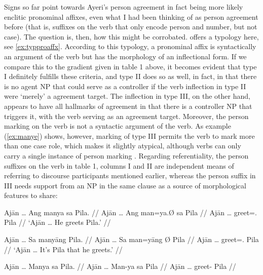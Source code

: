 Signs so far point towards Ayeri's person agreement in fact being more likely
enclitic pronominal affixes, even what I had been thinking of as person
agreement before (that is, suffixes on the verb that only encode person and
number, but not case). The question is, then, how this might be corrobated.
\citeauthor{corbett2006} offers a typology here, see \autoref{ex:typproaffx}.
According to this typology, a pronominal affix is syntactically an argument of
the verb but has the morphology of an inflectional form. If we compare this to
the gradient given in table 1 above, it becomes evident that type I definitely
fulfills these criteria, and type II does so as well, in fact, in that there is
no agent NP that could serve as a controller if the verb inflection in type II
were `merely' a agreement target. The inflection in type III, on the other
hand, appears to have all hallmarks of agreement in that there is a controller
NP that triggers it, with the verb serving as an agreement target. Moreover,
the person marking on the verb is not a syntactic argument of the verb. As
example (\ref{ex:manye}) shows, however, marking of type III permits the verb
to mark more than one case role, which makes it slightly atypical, although
verbs can only carry a single instance of person marking
\citep[103]{corbett2006}. Regarding referentiality, the person suffixes on the
verb in table 1, columns I and II are independent means of referring to
discourse participants mentioned earlier, whereas the person suffix in III
needs support from an NP in the same clause as a source of morphological
features to share:

\pex %
\a\label{ex:agttopclit}\begingl
	\gla Ajān … Ang manya sa Pila. //
	\glb Ajān … Ang man=ya.Ø sa ​Pila //
	\glc Ajān … \AgtT{} greet=\TsgM{}.\Top{} \Parg{} ​Pila //
	\glft `Ajān … He greets Pila.' //
\endgl

\a\label{ex:agtproclit}\begingl
	\gla Ajān … Sa manyāng {} Pila. //
	\glb Ajān … Sa man=yāng Ø Pila //
	\glc Ajān … \PatT{} greet=\TsgM{}.\Aarg{} \Top{} ​Pila //
	\glft `Ajān … It's Pila that he greets.' //
\endgl

\a\label{ex:wrongagr}\ljudge* \begingl
	\gla Ajān … Manya sa Pila. //
	\glb Ajān … Man-ya sa ​Pila //
	\glc Ajān … greet-\TsgM{} \Parg{} ​Pila //
\endgl

\xe

